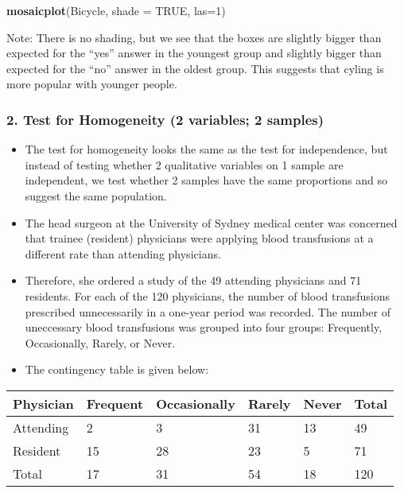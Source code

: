 \documentclass[]{article}
\newenvironment{Shaded}{\begin{snugshade}}{\end{snugshade}}
\newcommand{\DataTypeTok}[1]{\textcolor[rgb]{0.13,0.29,0.53}{#1}}
\newcommand{\DecValTok}[1]{\textcolor[rgb]{0.00,0.00,0.81}{#1}}
\newcommand{\KeywordTok}[1]{\textcolor[rgb]{0.13,0.29,0.53}{\textbf{#1}}}
\newcommand{\NormalTok}[1]{#1}
\newcommand{\OtherTok}[1]{\textcolor[rgb]{0.56,0.35,0.01}{#1}}
\providecommand{\tightlist}{%
  \setlength{\itemsep}{0pt}\setlength{\parskip}{0pt}}
\begin{document}
\begin{Shaded}
\begin{Highlighting}[]
\KeywordTok{mosaicplot}\NormalTok{(Bicycle, }\DataTypeTok{shade =} \OtherTok{TRUE}\NormalTok{, }\DataTypeTok{las=}\DecValTok{1}\NormalTok{)}
\end{Highlighting}
\end{Shaded}

Note: There is no shading, but we see that the boxes are slightly bigger than expected for the ``yes'' answer in the youngest group and slightly bigger than expected for the ``no'' answer in the oldest group. This suggests that cyling is more popular with younger people.

\hypertarget{test-for-homogeneity-2-variables-2-samples}{%
\subsubsection{2. Test for Homogeneity (2 variables; 2 samples)}\label{test-for-homogeneity-2-variables-2-samples}}

\begin{itemize}
\tightlist
\item
  The test for homogeneity looks the same as the test for independence, but instead of testing whether 2 qualitative variables on 1 sample are independent, we test whether 2 samples have the same proportions and so suggest the same population.
\end{itemize}

\begin{itemize}
\item
  The head surgeon at the University of Sydney medical center was concerned that trainee (resident) physicians were applying blood transfusions at a different rate than attending physicians.
\item
  Therefore, she ordered a study of the 49 attending physicians and 71 residents. For each of the 120 physicians, the number of blood transfusions prescribed unnecessarily in a one-year period was recorded. The number of uneccessary blood transfusions was grouped into four groups: Frequently, Occasionally, Rarely, or Never.
\item
  The contingency table is given below:
\end{itemize}

\begin{longtable}[]{@{}llllll@{}}
\toprule
Physician & Frequent & Occasionally & Rarely & Never & Total\tabularnewline
\midrule
\endhead
Attending & 2 & 3 & 31 & 13 & 49\tabularnewline
Resident & 15 & 28 & 23 & 5 & 71\tabularnewline
Total & 17 & 31 & 54 & 18 & 120\tabularnewline
\bottomrule
\end{longtable}
\end{document}
